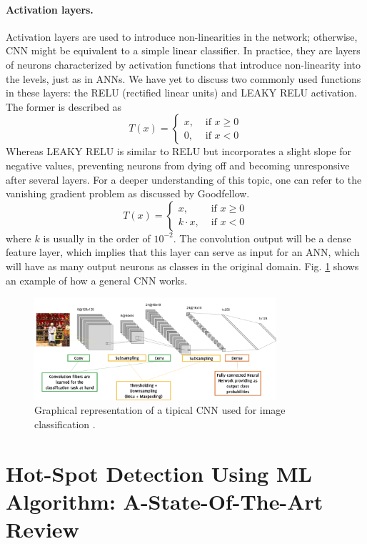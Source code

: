 \paragraph{Activation layers.} Activation layers are used to introduce non-linearities in the network; otherwise, CNN might be equivalent to a simple linear classifier. In practice, they are layers of neurons characterized by activation functions that introduce non-linearity into the levels, just as in ANNs. We have yet to discuss two commonly used functions in these layers: the RELU (rectified linear units) and LEAKY RELU activation. The former is described as
\begin{equation}
    \label{eq:RELU}
    T(x)=\left\{\begin{array}{rr}
    x, & \text { if } x \geq 0 \\
    0, & \text { if } x<0
\end{array}\right.
\end{equation}
Whereas LEAKY RELU is similar to RELU but incorporates a slight slope for negative values, preventing neurons from dying off and becoming unresponsive after several layers. For a deeper understanding of this topic, one can refer to the vanishing gradient problem as discussed by Goodfellow.
\begin{equation}
    \label{eq:LEAKYRELU}
    T(x)=\left\{\begin{array}{rr}
    x, & \text { if } x \geq 0 \\
    k\cdot x, & \text { if } x<0
\end{array}\right.
\end{equation}
where $k$ is usually in the order of $10^{-2}$.
The convolution output will be a dense feature layer, which implies that this layer can serve as input for an ANN, which will have as many output neurons as classes in the original domain. Fig. \ref{fig:typicalcnn} shows an example of how a general CNN works.
\begin{figure}
    \centering
    \includegraphics[width=0.8\textwidth]{Images/CNNtypical.png}
    \caption[CNN general structure.]{Graphical representation of a tipical CNN used for image classification \cite{giacomo_boracchi_convolutional_2021}.}
    \label{fig:typicalcnn}
\end{figure}


\section{Hot-Spot Detection Using ML Algorithm: A-State-Of-The-Art Review}
\label{sec:hotspotstateart}
